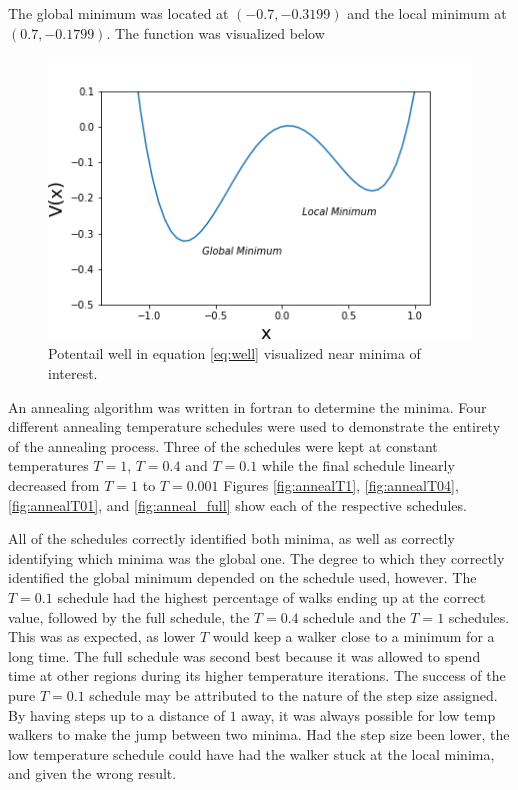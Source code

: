 \message{ !name(Assn1.tex)}\documentclass[twocolumn]{article}
\begin{document}
The global minimum was located at $(-0.7,-0.3199)$ and the local minimum at $(0.7, -0.1799)$. The function was visualized below

\begin{figure}
\centering
\includegraphics[width=\linewidth]{PotentialWell}
\caption{Potentail well in equation \ref{eq:well} visualized near minima of interest.}
\label{fig:PotentialWell}
\end{figure}

An annealing algorithm was written in fortran to determine the minima. Four different annealing temperature schedules were used to demonstrate the entirety of the annealing process. Three of the schedules were kept at constant temperatures $T=1$, $T=0.4$ and $T=0.1$ while the final schedule linearly decreased from $T=1$ to $T=0.001$ Figures \ref{fig:annealT1}, \ref{fig:annealT04}, \ref{fig:annealT01}, and \ref{fig:anneal_full} show each of the respective schedules.

All of the schedules correctly identified both minima, as well as correctly identifying which minima was the global one. The degree to which they correctly identified the global minimum depended on the schedule used, however. The $T=0.1$ schedule had the highest percentage of walks ending up at the correct value, followed by the full schedule, the $T=0.4$ schedule and the $T=1$ schedules. This was as expected, as lower $T$ would keep a walker close to a minimum for a long time. The full schedule was second best because it was allowed to spend time at other regions during its higher temperature iterations. The success of the pure $T=0.1$ schedule may be attributed to the nature of the step size assigned. By having steps up to a distance of $1$ away, it was always possible for low temp walkers to make the jump between two minima. Had the step size been lower, the low temperature schedule could have had the walker stuck at the local minima, and given the wrong result.
\end{document}
